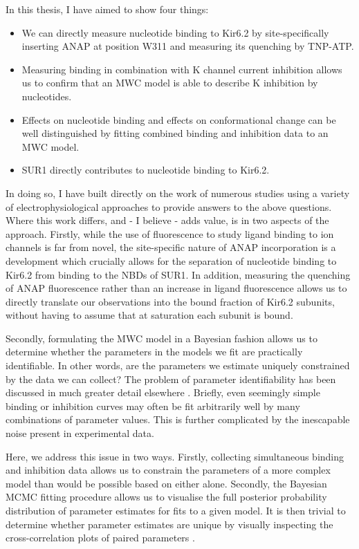In this thesis, I have aimed to show four things:
\begin{itemize}
\item We can directly measure nucleotide binding to Kir6.2 by site-specifically inserting ANAP at position W311 and measuring its quenching by TNP-ATP.
\item Measuring binding in combination with K\ATP{} channel current inhibition allows us to confirm that an MWC model is able to describe K\ATP{} inhibition by nucleotides.
\item Effects on nucleotide binding and effects on conformational change can be well distinguished by fitting combined binding and inhibition data to an MWC model.
\item SUR1 directly contributes to nucleotide binding to Kir6.2.
\end{itemize}

In doing so, I have built directly on the work of numerous studies using a variety of electrophysiological approaches to provide answers to the above questions.
Where this work differs, and - I believe - adds value, is in two aspects of the approach.
Firstly, while the use of fluorescence to study ligand binding to ion channels is far from novel, the site-specific nature of ANAP incorporation is a development which crucially allows for the separation of nucleotide binding to Kir6.2 from binding to the NBDs of SUR1.
In addition, measuring the quenching of ANAP fluorescence rather than an increase in ligand fluorescence allows us to directly translate our observations into the bound fraction of Kir6.2 subunits, without having to assume that at saturation each subunit is bound.

Secondly, formulating the MWC model in a Bayesian fashion allows us to determine whether the parameters in the models we fit are practically identifiable.
In other words, are the parameters we estimate uniquely constrained by the data we can collect?
The problem of parameter identifiability has been discussed in much greater detail elsewhere \cite{calderhead_bayesian_2013, hines_determination_2014-1, hines_primer_2015, middendorf_structural_2016}.
Briefly, even seemingly simple binding or inhibition curves may often be fit arbitrarily well by many combinations of parameter values.
This is further complicated by the inescapable noise present in experimental data.

Here, we address this issue in two ways.
Firstly, collecting simultaneous binding and inhibition data allows us to constrain the parameters of a more complex model than would be possible based on either alone.
Secondly, the Bayesian MCMC fitting procedure allows us to visualise the full posterior probability distribution of parameter estimates for fits to a given model.
It is then trivial to determine whether parameter estimates are unique by visually inspecting the cross-correlation plots of paired parameters \cite{hines_determination_2014-1}.

